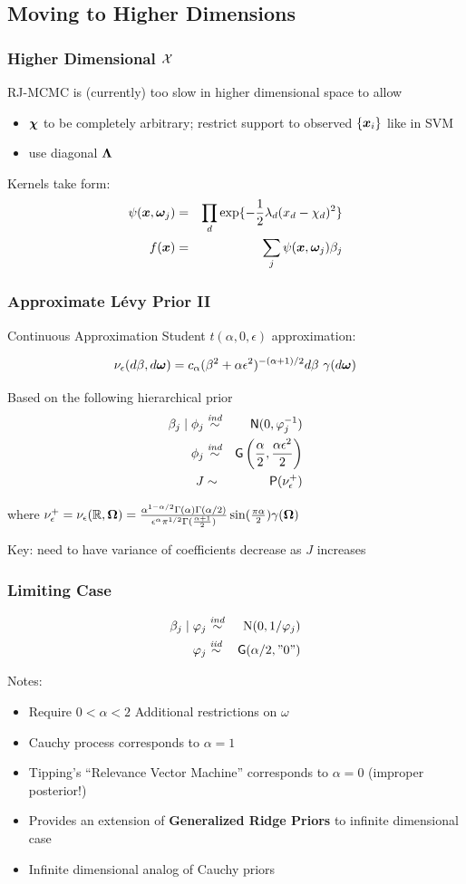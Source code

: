 \documentclass[handout]{beamer}
\newcommand{\bs}[2]{\begin{frame} \frametitle{#1}
{#2}
\end{frame} }
\begin{document}
\subsection{Moving to Higher Dimensions}


\bs{Higher Dimensional $\mathcal{X}$} {

RJ-MCMC is (currently) too slow in higher dimensional space to allow \pause
\begin{itemize}
\item $\bm \chi$ to be completely arbitrary; restrict support to
  observed $\{\bm x_i\}$ like in SVM \pause
\item use diagonal $\bm \Lambda$
\end{itemize}
Kernels take form:
\begin{eqnarray*}
\psi(\bm x, \bm \omega_j) & = & \prod_d \exp\{ -\frac{1}{2} \lambda_d (x_d - \chi_{d})^2
\} \\
f(\bm x) & =  & \sum_j \psi(\bm x, \bm \omega_j) \beta_j
\end{eqnarray*}
}


\bs{Approximate L\'evy Prior II} {
Continuous Approximation Student $t(\alpha, 0, \epsilon)$ approximation:

$$\nu_\epsilon(d\beta, d \bm \omega) = c_\alpha (\beta^2 + \alpha
\epsilon^2)^{-(\alpha + 1)/2} d\beta \ \gamma(d \bm \omega) $$

\pause

Based on the following hierarchical prior
\begin{eqnarray*}
  \beta_j \mid \phi_j & \mathrel{\mathop{\sim}\limits^{\mathit{ind}}} & \textsf{N}(0,  \varphi_j^{-1}) \\
  \phi_j    & \mathrel{\mathop{\sim}\limits^{\mathit{ind}}} & \mbox{\sf G}\left(\frac{\alpha}{2}, \frac{\alpha \epsilon^2}{2}\right) \\
   J & \sim & \mbox{\sf P}(\nu^+_\epsilon)
\end{eqnarray*}

where $\nu^+_\epsilon = \nu_\epsilon(\mathbb{R}, \bm \Omega) = \frac{\alpha ^{1
    - \alpha/2} \Gamma(\alpha)\Gamma(\alpha/2)}{\epsilon^\alpha
  \pi^{1/2} \Gamma(\frac{\alpha +1}{2})} \sin(\frac{\pi \alpha} {2}) \gamma(\bm \Omega)$

Key:  need to have variance of coefficients decrease as $J$ increases
}

\bs{Limiting Case} {
  \begin{eqnarray*}
    \beta_j   \mid  \varphi_j & \mathrel{\mathop{\sim}\limits^{\mathit{ind}}} &\mbox{\rm N}(0, 1/\varphi_j) \\
      \varphi_j & \mathrel{\mathop{\sim}\limits^{\mathit{iid}}} & \mbox{\sf G}(\alpha/2, "0")
  \end{eqnarray*}
\pause

Notes:
  \begin{itemize}
\item Require $0 < \alpha < 2$  Additional restrictions  on $\omega$  \pause
\item  Cauchy process corresponds to $\alpha = 1$ \pause
\item  Tipping's ``Relevance Vector Machine'' corresponds to $\alpha =
  0$  (improper posterior!) \pause
\item Provides an extension of {\bf{Generalized Ridge Priors}}
      to infinite dimensional case \pause
\item Infinite dimensional analog of Cauchy priors
 \end{itemize}
}
\end{document}
